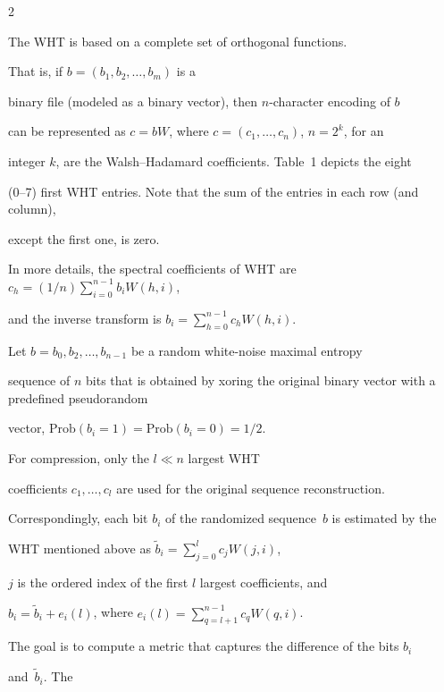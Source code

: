 \begin{multicols}{2}
\noindent

The WHT is based on a complete set of orthogonal functions.

 That is, if $b=(b_1,b_2,\ldots,b_m)$ is a

binary file (modeled as a binary vector), then $n$-character encoding of $b$ 

can be represented as $c=bW$, where $c=(c_1,\ldots,c_n)$, $n=2^k$, for an 

integer $k$, are the Walsh--Hadamard coefficients. Table~1 depicts the eight 

(0--7) first WHT entries. Note that the sum of the entries in each row (and column), 

except the first one, is zero.





In more details, the spectral coefficients of WHT are $c_h=(1/n) \sum\limits_{i=0}^{n-1} 

b_i W(h,i)$,

and the inverse transform is $b_i= \sum\limits_{h=0}^{n-1} c_h W(h,i)$.



Let $b=b_0,b_2,\ldots,b_{n-1}$ be a random white-noise maximal entropy

sequence of $n$ bits  that is obtained by xoring the original binary vector with a predefined pseudorandom 

vector, $\mathrm{Prob}\left(b_i=1\right)=\mathrm{Prob}\left(b_i=0\right)$\linebreak $=1/2$.





For compression, only the $l \ll n$ largest WHT

coefficients $c_1,\ldots,c_l$ are used for the original sequence reconstruction.

Correspondingly,   each bit $b_i$ of the randomized sequence~$b$ is  estimated by the

WHT mentioned above as  $\tilde b_i = \sum\limits_{j=0}^{l} c_j W(j,i)$, 

$j$ is the ordered index of the first $l$ largest coefficients, and  

$ b_i=\tilde b_i +e_i(l)$, where  $e_i(l)= \sum\limits_{q=l+1}^{n-1} c_q W(q,i)$.



The goal is to compute a metric that captures the difference of the bits $b_i$ 

and~$\tilde b_i$.  The


\end{multicols}
